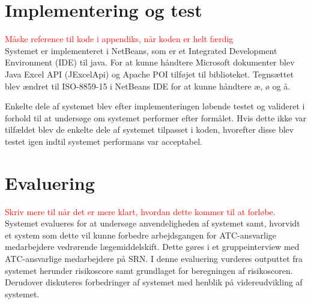 
\section{Implementering og test}
\textcolor{red}{Måske reference til kode i appendiks, når koden er helt færdig} \\
Systemet er implementeret i NetBeans, som er et Integrated Development Environment (IDE) til java. For at kunne håndtere Microsoft dokumenter blev Java Excel API (JExcelApi) og Apache POI tilføjet til biblioteket. Tegnsættet blev ændret til ISO-8859-15 i NetBeans IDE for at kunne håndtere æ, ø og å. 

Enkelte dele af systemet blev efter implementeringen løbende testet og valideret i forhold til at undersøge om systemet performer efter formålet. Hvis dette ikke var tilfældet blev de enkelte dele af systemet tilpasset i koden, hvorefter disse blev testet igen indtil systemet performans var acceptabel.

\section{Evaluering}
\textcolor{red}{Skriv mere til når det er mere klart, hvordan dette kommer til at forløbe.} \\
Systemet evalueres for at undersøge anvendeligheden af systemet samt, hvorvidt et system som dette vil kunne forbedre arbejdsgangen for ATC-ansvarlige medarbejdere vedrørende lægemiddelskift. Dette gøres i et gruppeinterview med ATC-ansvarlige medarbejdere på SRN. I denne evaluering vurderes outputtet fra systemet herunder risikoscore samt grundlaget for beregningen af risikoscoren. 
Derudover diskuteres forbedringer af systemet med henblik på videreudvikling af systemet.




